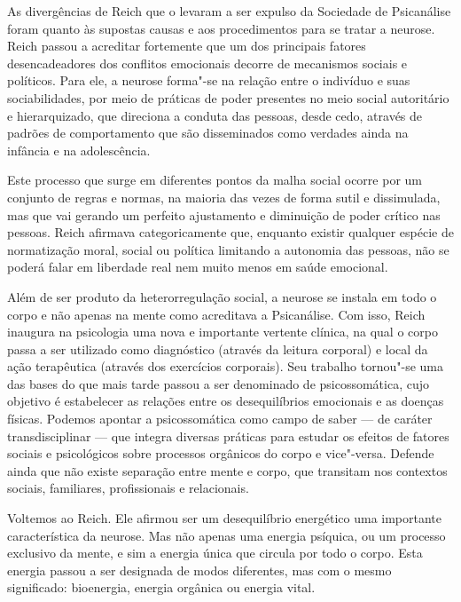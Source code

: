 As divergências de Reich que o levaram a ser expulso da Sociedade de
Psicanálise foram quanto às supostas causas e aos procedimentos para se
tratar a neurose. Reich passou a acreditar fortemente que um dos
principais fatores desencadeadores dos conflitos emocionais decorre de
mecanismos sociais e políticos. Para ele, a neurose forma"-se na relação
entre o indivíduo e suas sociabilidades, por meio de práticas de poder
presentes no meio social autoritário e hierarquizado, que direciona a
conduta das pessoas, desde cedo, através de padrões de comportamento que
são disseminados como verdades ainda na infância e na adolescência.

Este processo que surge em diferentes pontos da malha social ocorre por
um conjunto de regras e normas, na maioria das vezes de forma sutil e
dissimulada, mas que vai gerando um perfeito ajustamento e diminuição
de poder crítico nas pessoas. Reich afirmava categoricamente que,
enquanto existir qualquer espécie de normatização moral, social ou
política limitando a autonomia das pessoas, não se poderá falar em
liberdade real nem muito menos em saúde emocional.

Além de ser produto da heterorregulação social, a neurose se instala em
todo o corpo e não apenas na mente como acreditava a Psicanálise. Com
isso, Reich inaugura na psicologia uma nova e importante vertente
clínica, na qual o corpo passa a ser utilizado como diagnóstico (através
da leitura corporal) e local da ação terapêutica (através dos exercícios
corporais). Seu trabalho tornou"-se uma das bases do que mais tarde
passou a ser denominado de psicossomática, cujo objetivo é estabelecer
as relações entre os desequilíbrios emocionais e as doenças físicas.
Podemos apontar a psicossomática como campo de saber --- de caráter
transdisciplinar --- que integra diversas práticas para estudar os efeitos
de fatores sociais e psicológicos sobre processos orgânicos do corpo e
vice"-versa. Defende ainda que não existe separação entre mente e corpo,
que transitam nos contextos sociais, familiares, profissionais e
relacionais.

Voltemos ao Reich. Ele afirmou ser um desequilíbrio energético uma
importante característica da neurose. Mas não apenas uma energia
psíquica, ou um processo exclusivo da mente, e sim a energia única que
circula por todo o corpo. Esta energia passou a ser designada de modos
diferentes, mas com o mesmo significado: bioenergia, energia orgânica ou
energia vital.

